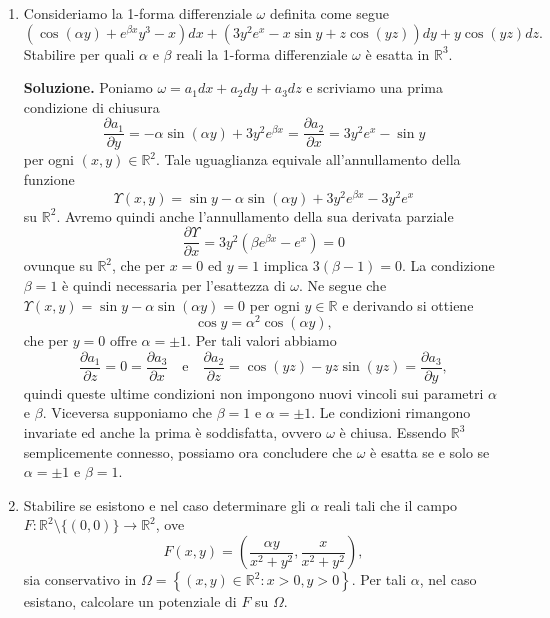 \begin{enumerate}
	\textbf{Soluzione.}
		Il problema equivale ad integrare la 1-forma differenziale
		\[
		\omega = \frac{x^3}{1 + x^4 + y^4 + z^4} dx + \frac{y^3}{1 + x^4 + y^4 + z^4} dy + \frac{z^3}{1 + x^4 + y^4 + z^4} dz
		\]
		lungo $\gamma$. Si osserva immediatamente che una primitiva di $\omega$ è
		\[
		g(x,y,z) = \frac{1}{4} \log \left(1 + x^4 + y^4 + z^4\right),
		\]
		dunque ne segue che
		\[
		\int_{\gamma} \omega = g(\gamma(1)) - g(\gamma(0)) = g(-1,2,0) - g(0,2,0) = \frac{1}{4} \log \left(\frac{18}{17}\right).
		\]
	
	
	\item Consideriamo la 1-forma differenziale $\omega$ definita come segue
	\[
	\left(\cos(\alpha y) + e^{\beta x} y^3 - x\right) dx + \left(3y^2 e^x - x \sin y + z \cos(yz)\right) dy + y \cos(yz) dz.
	\]
	Stabilire per quali $\alpha$ e $\beta$ reali la 1-forma differenziale $\omega$ è esatta in $\mathbb{R}^3$.
	
	\textbf{Soluzione.}
		Poniamo $\omega = a_1 dx + a_2 dy + a_3 dz$ e scriviamo una prima condizione di chiusura
		\[
		\frac{\partial a_1}{\partial y} = -\alpha \sin(\alpha y) + 3y^2 e^{\beta x} = \frac{\partial a_2}{\partial x} = 3y^2 e^x - \sin y
		\]
		per ogni $(x,y) \in \mathbb{R}^2$. Tale uguaglianza equivale all'annullamento della funzione
		\[
		\Upsilon(x,y) = \sin y - \alpha \sin(\alpha y) + 3y^2 e^{\beta x} - 3y^2 e^x
		\]
		su $\mathbb{R}^2$. Avremo quindi anche l'annullamento della sua derivata parziale
		\[
		\frac{\partial \Upsilon}{\partial x} = 3y^2 (\beta e^{\beta x} - e^x) = 0
		\]
		ovunque su $\mathbb{R}^2$, che per $x = 0$ ed $y = 1$ implica $3(\beta - 1) = 0$. La condizione $\beta = 1$ è quindi necessaria per l'esattezza di $\omega$. Ne segue che $\Upsilon(x,y) = \sin y - \alpha \sin(\alpha y) = 0$ per ogni $y \in \mathbb{R}$ e derivando si ottiene
		\[
		\cos y = \alpha^2 \cos(\alpha y),
		\]
		che per $y = 0$ offre $\alpha = \pm 1$. Per tali valori abbiamo
		\[
		\frac{\partial a_1}{\partial z} = 0 = \frac{\partial a_3}{\partial x} \quad \text{e} \quad \frac{\partial a_2}{\partial z} = \cos(yz) - y z \sin(yz) = \frac{\partial a_3}{\partial y},
		\]
		quindi queste ultime condizioni non impongono nuovi vincoli sui parametri $\alpha$ e $\beta$. Viceversa supponiamo che $\beta = 1$ e $\alpha = \pm 1$. Le condizioni rimangono invariate ed anche la prima è soddisfatta, ovvero $\omega$ è chiusa. Essendo $\mathbb{R}^3$ semplicemente connesso, possiamo ora concludere che $\omega$ è esatta se e solo se $\alpha = \pm 1$ e $\beta = 1$.
	
	
	\item Stabilire se esistono e nel caso determinare gli $\alpha$ reali tali che il campo $F: \mathbb{R}^2 \setminus \{(0,0)\} \to \mathbb{R}^2$, ove
	\[
	F(x,y) = \left(\frac{\alpha y}{x^2 + y^2}, \frac{x}{x^2 + y^2}\right),
	\]
	sia conservativo in $\Omega = \left\{(x,y) \in \mathbb{R}^2 : x > 0, y > 0\right\}$. Per tali $\alpha$, nel caso esistano, calcolare un potenziale di $F$ su $\Omega$.
	

\end{enumerate}
